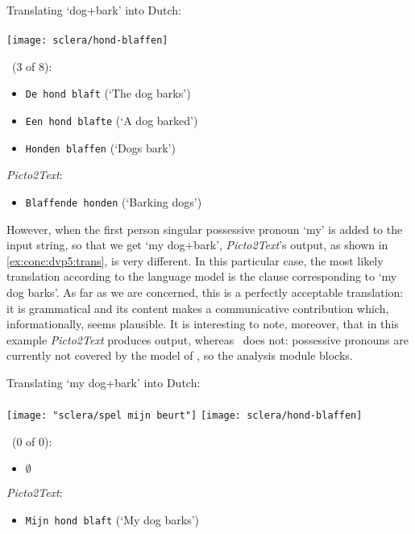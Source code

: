 \begin{exe}
    \ex \label{ex:conc:dvp4:trans} Translating `dog+bark' into Dutch: \\\\
     {\texttt{[image: sclera/hond-blaffen]}\hspace{0.5cm}}
    \begin{xlist}
        \ex \depicto\ (3 of 8):
            \begin{itemize}
                \item \texttt{De hond blaft} (`The dog barks')
                \item \texttt{Een hond blafte} (`A dog barked')
                \item \texttt{Honden blaffen} (`Dogs bark')
            \end{itemize}
        \ex \emph{Picto2Text}:
            \begin{itemize}
                \item \texttt{Blaffende honden} (`Barking dogs')
            \end{itemize}
    \end{xlist}
\end{exe}

However, when the first person singular possessive pronoun `my' is added to the
input string, so that we get `my dog+bark', \emph{Picto2Text}'s output, as
shown in \cref{ex:conc:dvp5:trans}, is very different. In this particular case,
the most likely translation according to the language model is the clause
corresponding to `my dog barks'. As far as we are concerned, this is a
perfectly acceptable translation: it is grammatical and its content makes a
communicative contribution which, informationally, seems plausible. It is
interesting to note, moreover, that in this example \emph{Picto2Text} produces
output, whereas \depicto\ does not: possessive pronouns are currently not
covered by the model of \sclera, so the analysis module blocks.

\begin{exe}
    \ex \label{ex:conc:dvp5:trans} Translating `my dog+bark' into Dutch: \\\\
     {\texttt{[image: "sclera/spel mijn beurt"]}\hspace{0.5cm}}
     {\texttt{[image: sclera/hond-blaffen]}\hspace{0.5cm}}
    \begin{xlist}
        \ex \depicto\ (0 of 0):
            \begin{itemize}
                \item $\emptyset$
            \end{itemize}
        \ex \emph{Picto2Text}:
            \begin{itemize}
                \item \texttt{Mijn hond blaft} (`My dog barks')
            \end{itemize}
    \end{xlist}
\end{exe}

